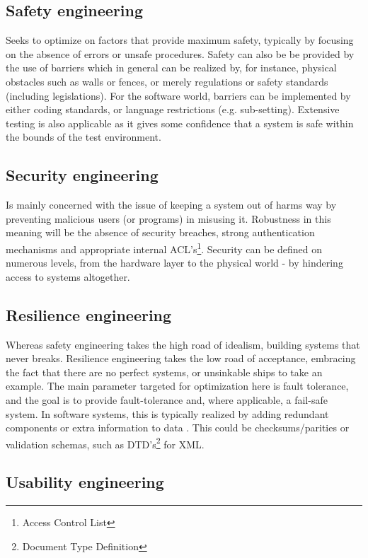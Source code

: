 \documentclass[10pt,a4paper]{article}
\begin{document}
\subsection{Safety engineering}

Seeks to optimize on factors that provide maximum safety, typically by focusing on the absence of errors or unsafe procedures. Safety can also be be provided by the use of barriers which in general can be realized by, for instance, physical obstacles such as walls or fences, or merely regulations or safety standards (including legislations).
For the software world, barriers can be implemented by either coding standards, or language restrictions (e.g. sub-setting). Extensive testing is also applicable as it gives some confidence that a system is safe within the bounds of the test environment.

\subsection{Security engineering}

Is mainly concerned with the issue of keeping a system out of harms way by preventing malicious users (or programs) in misusing it.
Robustness in this meaning will be the absence of security breaches, strong authentication mechanisms and appropriate internal ACL’s\footnote{Access Control List}.
Security can be defined on numerous levels, from the hardware layer to the physical world - by hindering access to systems altogether.

\subsection{Resilience engineering}
Whereas safety engineering takes the high road of idealism, building systems that never breaks. Resilience engineering takes the low road of acceptance, embracing the fact that there are no perfect systems, or unsinkable ships to take an example.
The main parameter targeted for optimization here is fault tolerance, and the goal is to provide fault-tolerance and, where applicable, a fail-safe system.
In software systems, this is typically realized by adding redundant components or extra information to data\cite{KoKr07}
. This could be checksums/parities or validation schemas, such as DTD’s\footnote{Document Type Definition} for XML.

\subsection{Usability engineering}
\end{document}
